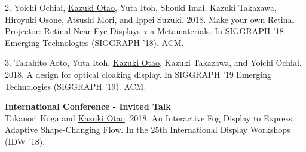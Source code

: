 \documentclass[margin]{res}
\begin{document}
\begin{resume}
2. Yoichi Ochiai, \underline{Kazuki Otao}, Yuta Itoh, Shouki Imai, Kazuki Takazawa, Hiroyuki Osone, Atsushi Mori, and Ippei Suzuki. 2018. Make your own Retinal Projector: Retinal Near-Eye Displays via Metamaterials. In SIGGRAPH ’18 Emerging Technologies (SIGGRAPH ’18). ACM.

3. Takahito Aoto, Yuta Itoh, \underline{Kazuki Otao}, Kazuki Takazawa, and Yoichi Ochiai. 2018. A design for optical cloaking display. In SIGGRAPH ’19 Emerging Technologies (SIGGRAPH ’19). ACM.

{\bf International Conference - Invited Talk} \\
Takanori Koga and \underline{Kazuki Otao}. 2018. An Interactive Fog Display to Express Adaptive Shape-Changing Flow. In the 25th International Display Workshops (IDW '18).

\end{resume}
\end{document}
